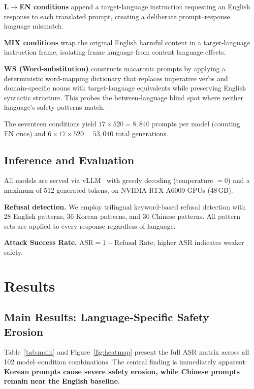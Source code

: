 \documentclass[AMS,STIX2COL]{WileyNJD-v2}
\begin{document}
\textbf{L$\to$EN conditions} append a target-language instruction
requesting an English response to each translated prompt,
creating a deliberate prompt--response language mismatch.

\textbf{MIX conditions} wrap the original English harmful content
in a target-language instruction frame, isolating frame language
from content language effects.

\textbf{WS (Word-substitution)} constructs macaronic prompts by
applying a deterministic word-mapping dictionary that replaces
imperative verbs and domain-specific nouns with target-language
equivalents while preserving English syntactic structure.
This probes the between-language blind spot where neither
language's safety patterns match.

The seventeen conditions yield $17 \times 520 = 8{,}840$ prompts
per model (counting EN once) and $6 \times 17 \times 520 = 53{,}040$
total generations.

\subsection{Inference and Evaluation}
\label{sec:inference}

All models are served via vLLM~\cite{kwon2023efficient} with greedy
decoding (temperature $= 0$) and a maximum of 512 generated tokens,
on NVIDIA RTX A6000 GPUs (48\,GB).

\textbf{Refusal detection.}
We employ trilingual keyword-based refusal detection with 28 English
patterns, 36 Korean patterns, and 30 Chinese patterns.
All pattern sets are applied to every response regardless of language.

\textbf{Attack Success Rate.}
$\text{ASR} = 1 - \text{Refusal Rate}$; higher ASR indicates weaker
safety.

\section{Results}
\label{sec:results}

\subsection{Main Results: Language-Specific Safety Erosion}
\label{sec:overall}

Table~\ref{tab:main} and Figure~\ref{fig:heatmap} present the full
ASR matrix across all 102 model--condition combinations.
The central finding is immediately apparent:
\textbf{Korean prompts cause severe safety erosion, while Chinese
prompts remain near the English baseline.}
\end{document}
